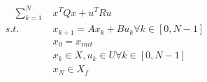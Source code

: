 \documentclass[preview]{standalone}
\begin{document}
\begin{align*}
\quad \sum_{k=1}^N \; &x^TQx + u^T R u \\ s.t. \quad &x_{k+1} = Ax_k + Bu_k \forall k \in [0, N-1] \\ &x_0 = x_{init} \\ &x_k \in X, u_k \in U \forall k \in [0, N-1] \\ &x_N \in X_f
\end{align*}
\end{document}
